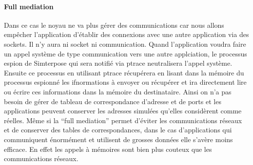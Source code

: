 \paragraph{Full mediation} 
Dans ce cas le noyau ne va plus gérer des communications car nous allons
empêcher l'application d'établir des connexions avec une autre application via
des sockets. Il n'y aura ni socket ni communication. Quand l'application voudra
faire un appel système de type communication vers une autre applciation, le
processus espion de Simterpose qui sera notifié via ptrace neutralisera l'appel
système. Ensuite ce processus en utilisant ptrace récupérera en lisant dans la
mémoire du processus espionné les ifnormations à envoyer ou récupérer et ira
directement lire ou écrire ces informations dans la mémoire du
destinataire. Ainsi on n'a pas besoin de gérer de tableau de correspondance
d'adresse et de ports et les applications peuvent conserver les adresses
simulées qu'elles considèrent comme réelles.  Même si la ``full mediation''
permet d'éviter les communications réseaux et de conserver des tables de
correspondances, dans le cas d'applications qui communiquent énormément et
utilisent de grosses données elle s'avère moins efficace. En effet les appels à
mémoires sont bien plus couteux que les communications réseaux.
